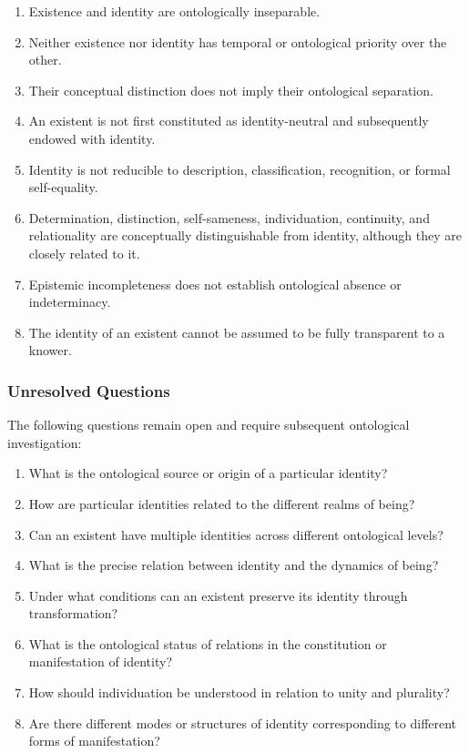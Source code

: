 \begin{enumerate}
    \item Existence and identity are ontologically inseparable.
    \item Neither existence nor identity has temporal or ontological priority over the other.
    \item Their conceptual distinction does not imply their ontological separation.
    \item An existent is not first constituted as identity-neutral and subsequently endowed with identity.
    \item Identity is not reducible to description, classification, recognition, or formal self-equality.
    \item Determination, distinction, self-sameness, individuation, continuity, and relationality are conceptually distinguishable from identity, although they are closely related to it.
    \item Epistemic incompleteness does not establish ontological absence or indeterminacy.
    \item The identity of an existent cannot be assumed to be fully transparent to a knower.
\end{enumerate}

\subsubsection{Unresolved Questions}

The following questions remain open and require subsequent ontological investigation:

\begin{enumerate}
    \item What is the ontological source or origin of a particular identity?
    \item How are particular identities related to the different realms of being?
    \item Can an existent have multiple identities across different ontological levels?
    \item What is the precise relation between identity and the dynamics of being?
    \item Under what conditions can an existent preserve its identity through transformation?
    \item What is the ontological status of relations in the constitution or manifestation of identity?
    \item How should individuation be understood in relation to unity and plurality?
    \item Are there different modes or structures of identity corresponding to different forms of manifestation?
\end{enumerate}

